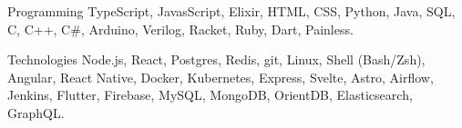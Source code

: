 

\begin{cvskills}

  \cvskill
    {Programming} %
    {TypeScript, JavasScript, Elixir, HTML, CSS, Python, Java, SQL, C, C++, C\#,  Arduino, Verilog, Racket, Ruby, Dart, Painless.} %

  \cvskill
    {Technologies} %
    {Node.js, React, Postgres, Redis, git, Linux, Shell (Bash/Zsh), Angular, React Native, Docker, Kubernetes, Express, Svelte, Astro, Airflow, Jenkins, Flutter, Firebase, MySQL, MongoDB, OrientDB, Elasticsearch, GraphQL.} %


\end{cvskills}
